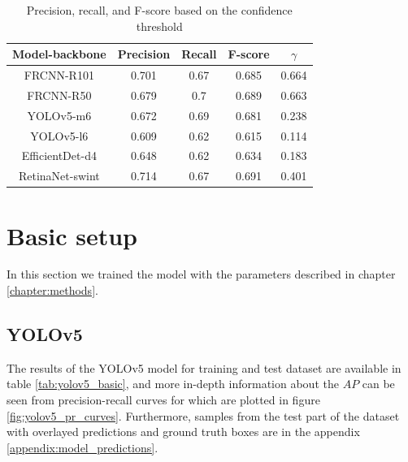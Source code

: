 \begin{table}[H]
    \begin{tabular}{|c|c|c|c|c|}
        \hline
        Model-backbone  & Precision & Recall & F-score & $\gamma$ \\ \hline
        FRCNN-R101      & 0.701     & 0.67   & 0.685   & 0.664    \\ \hline
        FRCNN-R50       & 0.679     & 0.7    & 0.689   & 0.663    \\ \hline
        YOLOv5-m6       & 0.672     & 0.69   & 0.681   & 0.238    \\ \hline
        YOLOv5-l6       & 0.609     & 0.62   & 0.615   & 0.114    \\ \hline
        EfficientDet-d4 & 0.648     & 0.62   & 0.634   & 0.183    \\ \hline
        RetinaNet-swint & 0.714     & 0.67   & 0.691   & 0.401    \\ \hline
    \end{tabular}
    \caption{Precision, recall, and F-score based on the confidence threshold}
    \label{tab:model_prf:stage_five}
\end{table}


\section{Basic setup}
In this section we trained the model with the parameters described in chapter \ref{chapter:methods}.
\subsection{YOLOv5}
The results of the YOLOv5 model for training and test dataset are available in table \ref{tab:yolov5_basic}, and more in-depth information about the $AP$ can be seen from precision-recall curves for which are plotted in figure \ref{fig:yolov5_pr_curves}. Furthermore, samples from the test part of the dataset with overlayed predictions and ground truth boxes are in the appendix \ref{appendix:model_predictions}.

